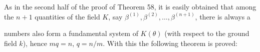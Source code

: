 As in the second half of the proof of Theorem 58, it is easily obtained that among the $n+1$ quantities of the field $K$, say $\beta^{(1)}, \beta^{(2)}, \ldots, \beta^{(n+1)}$, there is always a

numbers also form a fundamental system of $K(\theta)$ (with respect to the ground field $k$), hence $mq = n$, $q = n/m$. With this the following theorem is proved:
